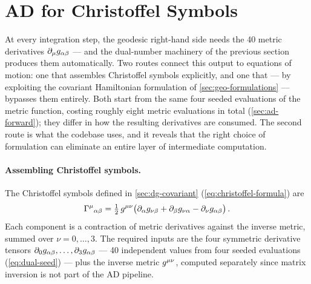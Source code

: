 \section{AD for Christoffel Symbols}
\label{sec:ad-christoffels}

At every integration step, the geodesic right-hand side needs the
40 metric derivatives $\partial_{\mu} g_{\alpha\beta}$ --- and the
dual-number machinery of the previous section produces them
automatically.  Two routes connect this output to equations of
motion: one that assembles Christoffel symbols explicitly, and
one that --- by exploiting the covariant Hamiltonian formulation
of \cref{sec:geo-formulations} --- bypasses them entirely.  Both
start from the same four seeded evaluations of the metric
function, costing roughly eight metric evaluations in total
(\cref{sec:ad-forward}); they differ in how the resulting
derivatives are consumed.  The second route is what the codebase
uses, and it reveals that the right choice of formulation can
eliminate an entire layer of intermediate computation.

\paragraph{Assembling Christoffel symbols.}

The Christoffel symbols defined in \cref{sec:dg-covariant}
(\cref{eq:christoffel-formula}) are
%
\begin{equation}
  \Gamma^{\mu}{}_{\alpha \beta}
    = \tfrac{1}{2}\,g^{\mu\nu}\bigl(
        \partial_{\alpha} g_{\nu\beta}
      + \partial_{\beta} g_{\nu\alpha}
      - \partial_{\nu} g_{\alpha\beta}
    \bigr) \,.
  \label{eq:christoffel-recall}
\end{equation}
%
Each component is a contraction of metric derivatives against the
inverse metric, summed over $\nu = 0, \ldots, 3$.  The required
inputs are the four symmetric derivative tensors
$\partial_{0} g_{\alpha\beta}, \ldots, \partial_{3} g_{\alpha\beta}$ --- 40
independent values from four seeded evaluations
(\cref{eq:dual-seed}) --- plus the inverse metric $g^{\mu\nu}$,
computed separately since matrix inversion is not part of the AD
pipeline.

